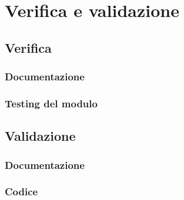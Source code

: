 
\chapter{Verifica e validazione}
\label{cap:verifica-validazione}

\section{Verifica}


\subsection{Documentazione}

\subsection{Testing del modulo}

\section{Validazione}

\subsection{Documentazione}

\subsection{Codice}

